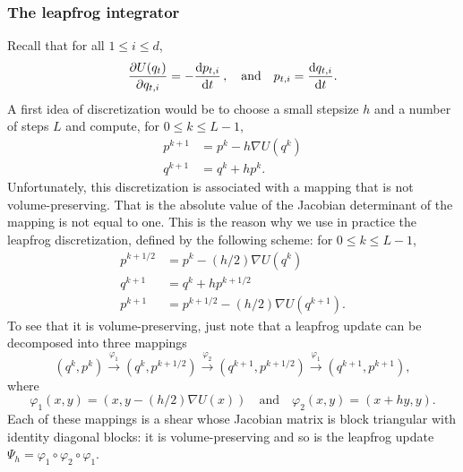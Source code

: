\documentclass[english,graybox,envcountchap,envcountsame,sectrefs,shortlabels]{svmono}
\theoremstyle{style}
\newcommand{\eqsp}{}
\begin{document}
\subsubsection*{The leapfrog integrator}

Recall that for all $1\leq i \leq d$,
$$
\frac{\partial U(q_t)}{\partial q_{t,i}}=-\frac{\rmd p_{t,i}}{\rmd t}\,,  \quad \mbox{and} \quad
p_{t,i}=\frac{\rmd q_{t,i}}{\rmd t}\eqsp.
$$
A first idea of discretization would be to choose a small stepsize $h$ and a number of steps $L$ and compute, for $0\leq k \leq L-1$,
\begin{align*}
p^{k+1}&=p^{k}-h \nabla U (q^{k})\\
q^{k+1}&=q^k+h p^{k}\eqsp.
\end{align*}
Unfortunately, this discretization is associated with a mapping  that is not volume-preserving. That is the absolute value of the Jacobian determinant of the mapping is not equal to one. This is the reason why we use in practice the leapfrog discretization, defined by the following scheme: for $0\leq k \leq L-1$,
\begin{align}
p^{k+1/2}&=p^k-(h/2) \nabla U(q^k) \nonumber\\
q^{k+1}&=q^k+h p^{k+1/2}\nonumber \\
p^{k+1}&=p^{k+1/2}-(h/2) \nabla U (q^{k+1})\eqsp. \label{eq:leap:update}
\end{align}
To see that it is volume-preserving, just note that a leapfrog update can be decomposed into three mappings
\begin{equation}
\label{eq:leap:decomp}
(q^k,p^k) \stackrel{\varphi_1}{\longrightarrow} (q^k,p^{k+1/2}) \stackrel{\varphi_2}{\longrightarrow} (q^{k+1},p^{k+1/2}) \stackrel{\varphi_1}{\longrightarrow} (q^{k+1},p^{k+1})\eqsp,
\end{equation}
where
\begin{equation}\label{eq:def:varphi}
\varphi_1(x,y)=(x,y-(h/2)\nabla U(x))\quad \mbox{and}\quad  \varphi_2(x,y)=(x+hy,y)\eqsp.
\end{equation}
Each of these mappings is a shear whose Jacobian matrix is block triangular with identity diagonal blocks: it is volume-preserving and so is the leapfrog update $\Psi_h = \varphi_1\circ\varphi_2\circ\varphi_1$.
\end{document}
